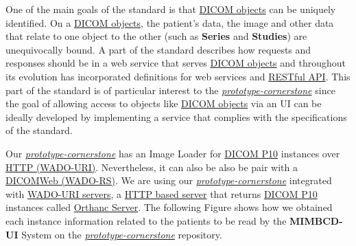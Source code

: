 \documentclass{tufte-book} %
\begin{document}
One of the main goals of the standard is that \href{http://isdis.net/wp-content/uploads/2015/12/caffery_objects_IM.pdf}{DICOM objects} can be uniquely identified. On a \href{http://isdis.net/wp-content/uploads/2015/12/caffery_objects_IM.pdf}{DICOM objects}, the patient's data, the image and other data that relate to one object to the other (such as \textbf{Series} and \textbf{Studies}) are unequivocally bound. A part of the standard describes how requests and responses should be in a web service that serves \href{http://isdis.net/wp-content/uploads/2015/12/caffery_objects_IM.pdf}{DICOM objects} and throughout its evolution has incorporated definitions for web services and \href{https://en.wikipedia.org/wiki/Representational_state_transfer}{RESTful API}. This part of the standard is of particular interest to the \href{https://github.com/MIMBCD-UI/prototype-cornerstone}{\textit{prototype-cornerstone}} since the goal of allowing access to objects like \href{http://isdis.net/wp-content/uploads/2015/12/caffery_objects_IM.pdf}{DICOM objects} via an UI can be ideally developed by implementing a service that complies with the specifications of the standard.

\clearpage

Our \href{https://github.com/MIMBCD-UI/prototype-cornerstone}{\textit{prototype-cornerstone}} has an Image Loader for \href{http://www.web3.lu/dicom-standard/}{DICOM P10} instances over \href{http://dicom.nema.org/dicom/2013/output/chtml/part18/sect_6.3.html}{HTTP (WADO-URI)}. Nevertheless, it can also be also be pair with a \href{http://dicom.nema.org/medical/dicom/current/output/html/part18.html}{DICOMWeb (WADO-RS)}. We are using our \href{https://github.com/MIMBCD-UI/prototype-cornerstone}{\textit{prototype-cornerstone}} integrated with \href{http://dicom.nema.org/dicom/2013/output/chtml/part18/sect_6.3.html}{WADO-URI servers}, a \href{https://en.wikipedia.org/wiki/Web_API}{HTTP based server} that returns \href{http://www.web3.lu/dicom-standard/}{DICOM P10} instances called \href{https://www.orthanc-server.com/}{Orthanc Server}. The following Figure shows how we obtained each instance information related to the patients to be read by the \textbf{MIMBCD-UI} System on the \href{https://github.com/MIMBCD-UI/prototype-cornerstone}{\textit{prototype-cornerstone}} repository.


\hfill
\end{document}
